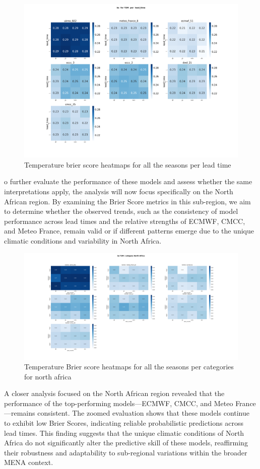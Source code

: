 \begin{figure}[H]
    \centering
    \includegraphics[width=1\linewidth]{plots/prob/bs/bs_T2M_lead_time.png}
    \caption{Temperature brier score heatmaps for all the seasons per lead time}
\end{figure}
o further evaluate the performance of these models and assess whether the same interpretations apply, the analysis will now focus specifically on the North African region. By examining the Brier Score metrics in this sub-region, we aim to determine whether the observed trends, such as the consistency of model performance across lead times and the relative strengths of ECMWF, CMCC, and Meteo France, remain valid or if different patterns emerge due to the unique climatic conditions and variability in North Africa.

\begin{figure}[H]
    \centering
    \includegraphics[width=1\linewidth]{plots/prob/bs/bs_T2M_category_North_Africa.png}
    \caption{Temperature Brier score heatmaps for all the seasons per categories for north africa}
\end{figure}
A closer analysis focused on the North African region revealed that the performance of the top-performing models—ECMWF, CMCC, and Meteo France—remains consistent. The zoomed evaluation shows that these models continue to exhibit low Brier Scores, indicating reliable probabilistic predictions across lead times. This finding suggests that the unique climatic conditions of North Africa do not significantly alter the predictive skill of these models, reaffirming their robustness and adaptability to sub-regional variations within the broader MENA context.


